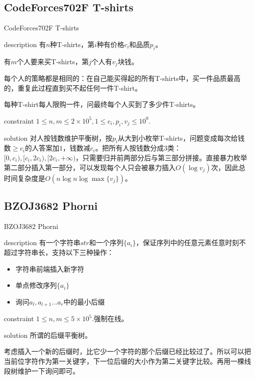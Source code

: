 \documentclass{beamer}
\begin{document}
\subsection{CodeForces702F T-shirts}
\begin{frame}{CodeForces702F T-shirts}
\begin{block}{description}
	有$n$种T-shirts，第$i$种有价格$c_i$和品质$p_i$。
	
	有$m$个人要来买T-shirts，第$j$个人有$v_j$块钱。
	
	每个人的策略都是相同的：在自己能买得起的所有T-shirts中，买一件品质最高的，重复此过程直到买不起任何一件T-shirt。
	
	每种T-shirt每人限购一件，问最终每个人买到了多少件T-shirts。
\end{block}
\begin{block}{constraint}
	$ 1\le n, m \le 2\times 10^5, 1 \le c_i, p_i, v_j \le 10^9.$
\end{block}
\pause
\begin{block}{solution}
	对人按钱数维护平衡树，按$p_i$从大到小枚举T-shirts，问题变成每次给钱数$\ge c_i$的人答案加$1$，钱数减$c_i$。把所有人按钱数分成$3$类：$[0,c_i),[c_i,2c_i),[2c_i,+\infty)$，只需要归并前两部分后与第三部分拼接。直接暴力枚举第二部分插入第一部分，可以发现每个人只会被暴力插入$O(\log v_j)$次，因此总时间复杂度是$O(n\log n\log \max\{v_j\})$。
\end{block}
\end{frame}
\subsection{BZOJ3682 Phorni}
\begin{frame}{BZOJ3682 Phorni}
\begin{block}{description}
有一个字符串$str$和一个序列$\{a_i\}$，保证序列中的任意元素任意时刻不超过字符串长，支持以下三种操作：
\begin{itemize}
	\item 字符串前端插入新字符
	\item 单点修改序列$\{a_i\}$
	\item 询问$a_l,a_{l+1}...a_r$中的最小后缀
\end{itemize}
\end{block}
\begin{block}{constraint}
$1 \le n, m \le 5\times 10^5.$强制在线。
\end{block}
\pause
\begin{block}{solution}
所谓的后缀平衡树。

考虑插入一个新的后缀时，比它少一个字符的那个后缀已经比较过了。所以可以把当前位字符作为第一关键字，下一位后缀的大小作为第二关键字比较。再用一棵线段树维护一下询问即可。
\end{block}
\end{frame}
\end{document}
